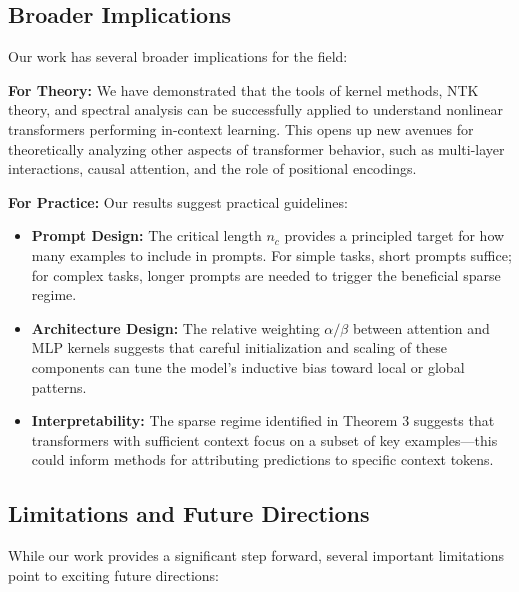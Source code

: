 	\subsection{Broader Implications}
	
	Our work has several broader implications for the field:
	
	\textbf{For Theory:} We have demonstrated that the tools of kernel methods, NTK theory, and spectral analysis can be successfully applied to understand nonlinear transformers performing in-context learning. This opens up new avenues for theoretically analyzing other aspects of transformer behavior, such as multi-layer interactions, causal attention, and the role of positional encodings.
	
	\textbf{For Practice:} Our results suggest practical guidelines:
	\begin{itemize}
		\item \textbf{Prompt Design:} The critical length \(n_c\) provides a principled target for how many examples to include in prompts. For simple tasks, short prompts suffice; for complex tasks, longer prompts are needed to trigger the beneficial sparse regime.
		\item \textbf{Architecture Design:} The relative weighting \(\alpha/\beta\) between attention and MLP kernels suggests that careful initialization and scaling of these components can tune the model's inductive bias toward local or global patterns.
		\item \textbf{Interpretability:} The sparse regime identified in Theorem 3 suggests that transformers with sufficient context focus on a subset of key examples—this could inform methods for attributing predictions to specific context tokens.
	\end{itemize}
	
	\subsection{Limitations and Future Directions}
	
	While our work provides a significant step forward, several important limitations point to exciting future directions:
	
